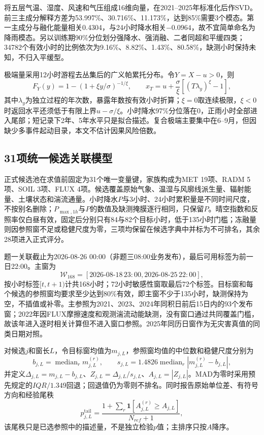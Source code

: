 将五层气温、湿度、风速和气压组成16维向量，在2021--2025年标准化后作SVD。前三主成分解释方差为53.997\%、30.716\%、11.173\%，达到85\%需要3个模态。第一主成分与融化能量相关0.4304，与24小时降水相关$-0.0964$，故不宜简单命名为降雨模态。另以训练期90\%分位划分强降水、强消融、二者同超和平缓四类；34782个有效小时的比例依次为9.16\%、8.82\%、1.43\%、80.58\%，缺测小时保持未知，不归入平缓型。

极端量采用12小时游程去丛集后的广义帕累托分布。令$Y=X-u>0$，则
\begin{equation}
F_Y(y)=1-\left(1+\xi y/\sigma\right)^{-1/\xi},\qquad
x_T=u+\frac{\sigma}{\xi}\left[(T\lambda_y)^{\xi}-1\right],
\end{equation}
其中$\lambda_y$为独立过程的年次数，暴露年数按有效小时折算；$\xi=0$取连续极限，$\xi<0$时返回水平还须低于有限上界$u-\sigma/\xi$。小时降水97\%分位落在0，正雨小时全部进入尾部；短记录下2年、5年水平只是拟合描述。复合极端主要集中在6--9月，但因缺少多事件起动目录，本文不估计因果风险倍数。

\subsection{31项统一候选关联模型}
正式候选池在求值前固定为31个唯一变量键，家族构成为MET 19项、RADM 5项、SOIL 3项、FLUX 4项。候选覆盖原始气象、温湿与风廓线派生量、辐射能量、土壤状态和湍流通量。小时降水$P$与3小时、24小时累积量是不同时间尺度，不按别名删除；$P_{\max,1h}$与$P$的数值及缺测掩膜逐行相同，只保留$P$。晴空指数和反照率仅白昼有效，固定后分别只有84与82个目标小时，低于135小时门槛；冻融量则因参照窗不足或稳健尺度为零，三项均保留在候选字典中并标为不可排名，其余28项进入正式评分。

题一关联截止为2026-08-26 00:00（非题三08:00业务发布），最后可用标签为前一日22:00。主窗为
\begin{equation}
\mathcal W_{168}=[2026\text{-}08\text{-}18\,23{:}00,
2026\text{-}08\text{-}25\,22{:}00],
\end{equation}
按小时标签$[t,t+1)$计共168小时；72小时敏感性窗取最后72个标签。目标窗和每个候选的参照窗均要求至少达到80\%有效，即主窗不少于135小时，缺测保持为空，不插值或补零。主参照为2021、2023、2024年同积日前后15日内的93个发布窗；2022年因FLUX摩擦速度和观测湍流动能缺测，没有窗口通过共同覆盖门槛，故该年进入逐时相关计算但不进入窗口参照。2025年同历日窗作为无灾害真值的同类日期对照。

对候选$j$和窗长$L$，令目标窗均值为$m_{j,L}$，参照窗均值的中位数和稳健尺度分别为
\begin{equation}
b_{j,L}=\operatorname{median}_r m^{(r)}_{j,L},\qquad
s_{j,L}=1.4826\operatorname{median}_r
\left|m^{(r)}_{j,L}-b_{j,L}\right|,
\end{equation}
并定义$\Delta_{j,L}=m_{j,L}-b_{j,L}$、$Z_{j,L}=\Delta_{j,L}/s_{j,L}$、$A_{j,L}=|Z_{j,L}|$。MAD为零时采用预先规定的$IQR/1.349$回退；回退值仍为零则不排名。同时报告原始单位差、有符号方向和经验尾秩
\begin{equation}
p^{\mathrm{tail}}_{j,L}=
\frac{1+\sum_r\mathbf 1[A^{(r)}_{j,L}\ge A_{j,L}]}{N_{ref}+1},
\end{equation}
该尾秩只是已选参照中的描述量，不是独立检验$p$值；主排序只按$A$降序。

